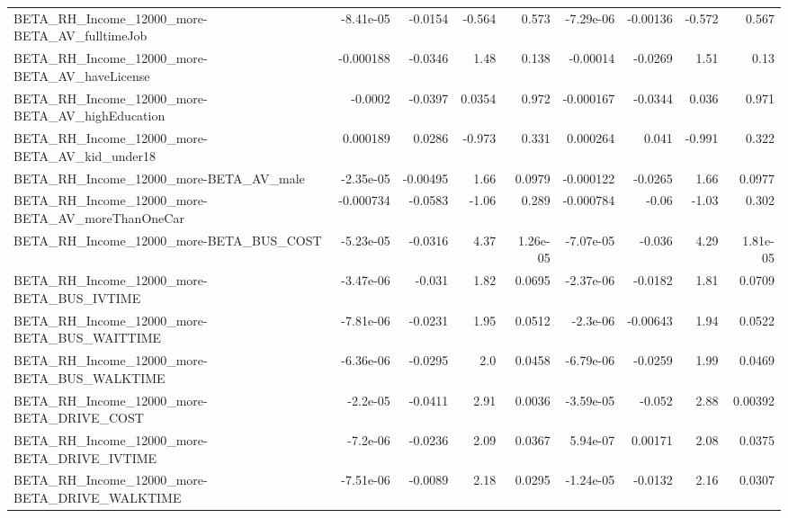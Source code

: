 \begin{tabular}{lrrrrrrrr}
BETA\_RH\_Income\_12000\_more-BETA\_AV\_fulltimeJob      &   -8.41e-05 &      -0.0154 &    -0.564 &    0.573 &  -7.29e-06 &    -0.00136 &       -0.572 &         0.567 \\
BETA\_RH\_Income\_12000\_more-BETA\_AV\_haveLicense      &   -0.000188 &      -0.0346 &      1.48 &    0.138 &   -0.00014 &     -0.0269 &         1.51 &          0.13 \\
BETA\_RH\_Income\_12000\_more-BETA\_AV\_highEducation    &     -0.0002 &      -0.0397 &    0.0354 &    0.972 &  -0.000167 &     -0.0344 &        0.036 &         0.971 \\
BETA\_RH\_Income\_12000\_more-BETA\_AV\_kid\_under18      &    0.000189 &       0.0286 &    -0.973 &    0.331 &   0.000264 &       0.041 &       -0.991 &         0.322 \\
BETA\_RH\_Income\_12000\_more-BETA\_AV\_male             &   -2.35e-05 &     -0.00495 &      1.66 &   0.0979 &  -0.000122 &     -0.0265 &         1.66 &        0.0977 \\
BETA\_RH\_Income\_12000\_more-BETA\_AV\_moreThanOneCar   &   -0.000734 &      -0.0583 &     -1.06 &    0.289 &  -0.000784 &       -0.06 &        -1.03 &         0.302 \\
BETA\_RH\_Income\_12000\_more-BETA\_BUS\_COST            &   -5.23e-05 &      -0.0316 &      4.37 & 1.26e-05 &  -7.07e-05 &      -0.036 &         4.29 &      1.81e-05 \\
BETA\_RH\_Income\_12000\_more-BETA\_BUS\_IVTIME          &   -3.47e-06 &       -0.031 &      1.82 &   0.0695 &  -2.37e-06 &     -0.0182 &         1.81 &        0.0709 \\
BETA\_RH\_Income\_12000\_more-BETA\_BUS\_WAITTIME        &   -7.81e-06 &      -0.0231 &      1.95 &   0.0512 &   -2.3e-06 &    -0.00643 &         1.94 &        0.0522 \\
BETA\_RH\_Income\_12000\_more-BETA\_BUS\_WALKTIME        &   -6.36e-06 &      -0.0295 &       2.0 &   0.0458 &  -6.79e-06 &     -0.0259 &         1.99 &        0.0469 \\
BETA\_RH\_Income\_12000\_more-BETA\_DRIVE\_COST          &    -2.2e-05 &      -0.0411 &      2.91 &   0.0036 &  -3.59e-05 &      -0.052 &         2.88 &       0.00392 \\
BETA\_RH\_Income\_12000\_more-BETA\_DRIVE\_IVTIME        &    -7.2e-06 &      -0.0236 &      2.09 &   0.0367 &   5.94e-07 &     0.00171 &         2.08 &        0.0375 \\
BETA\_RH\_Income\_12000\_more-BETA\_DRIVE\_WALKTIME      &   -7.51e-06 &      -0.0089 &      2.18 &   0.0295 &  -1.24e-05 &     -0.0132 &         2.16 &        0.0307 \\

\end{tabular}
